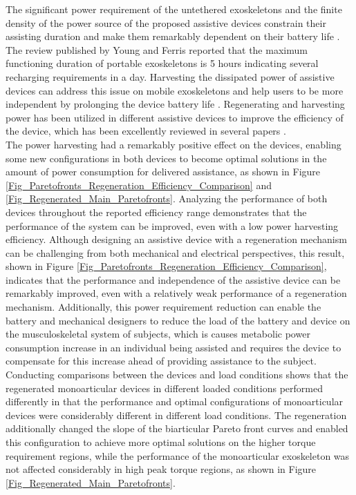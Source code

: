 \documentclass[10pt,letterpaper]{article}
\begin{document}
The significant power requirement of the untethered exoskeletons and the finite density of the power source of the proposed assistive devices constrain their assisting duration and make them remarkably dependent on their battery life \cite{140}. The review published by Young and Ferris \cite {36} reported that the maximum functioning duration of portable exoskeletons is 5 hours indicating several recharging requirements in a day. Harvesting the dissipated power of assistive devices can address this issue on mobile exoskeletons and help users to be more independent by prolonging the device battery life \cite{140,141,142}. Regenerating and harvesting power has been utilized in different assistive devices to improve the efficiency of the device, which has been excellently reviewed in several papers \cite{140,141,142}.\\
The power harvesting had a remarkably positive effect on the devices, enabling some new configurations in both devices to become optimal solutions in the amount of power consumption for delivered assistance, as shown in Figure \ref{Fig_Paretofronts_Regeneration_Efficiency_Comparison} and \ref{Fig_Regenerated_Main_Paretofronts}. Analyzing the performance of both devices throughout the reported efficiency range demonstrates that the performance of the system can be improved, even with a low power harvesting efficiency. Although designing an assistive device with a regeneration mechanism can be challenging from both mechanical and electrical perspectives, this result, shown in Figure \ref{Fig_Paretofronts_Regeneration_Efficiency_Comparison}, indicates that the performance and independence of the assistive device can be remarkably improved, even with a relatively weak performance of a regeneration mechanism. Additionally, this power requirement reduction can enable the battery and mechanical designers to reduce the load of the battery and  device on the musculoskeletal system of subjects, which is causes metabolic power consumption increase in an individual being assisted and requires the device to compensate for this increase ahead of providing assistance to the subject.\\
Conducting comparisons between the devices and load conditions shows that the regenerated monoarticular devices in different loaded conditions performed differently in that the performance and optimal configurations of monoarticular devices were considerably different in different load conditions. The regeneration additionally changed the slope of the biarticular Pareto front curves and enabled this configuration to achieve more optimal solutions on the higher torque requirement regions, while the performance of the monoarticular exoskeleton was not affected considerably in high peak torque regions, as shown in Figure \ref{Fig_Regenerated_Main_Paretofronts}.\\
\end{document}
